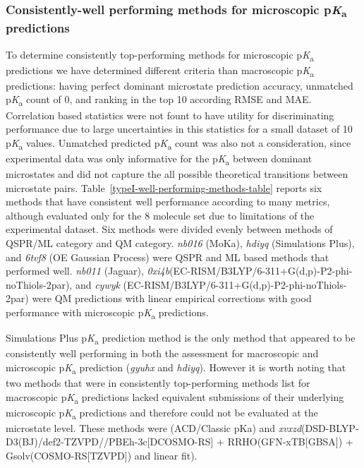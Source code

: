 \documentclass[9pt,lineno,final]{elife}
\newcommand{\pKa}{p\textit{K}\textsubscript{a}}
\begin{document}
\subsubsection{Consistently-well performing methods for microscopic \pKa{} predictions}

To determine consistently top-performing methods for microscopic \pKa{} predictions we have determined different criteria than macroscopic \pKa{} predictions: having perfect dominant microstate prediction accuracy, unmatched \pKa{} count of 0, and ranking in the top 10 according RMSE and MAE. Correlation based statistics were not fount to have utility for discriminating performance due to large uncertainties in this statistics for a small dataset of 10 \pKa{} values. Unmatched predicted \pKa{} count was also not a consideration, since experimental data was only informative for the \pKa{} between dominant microstates and did not capture the all possible theoretical transitions between microstate pairs. Table~\ref{typeI-well-performing-methods-table} reports six methods that have consistent well performance according to many metrics, although evaluated only for the 8 molecule set due to limitations of the experimental dataset. Six methods were divided evenly between methods of QSPR/ML category and QM category. \textit{nb016} (MoKa), \textit{hdiyq} (Simulations Plus), and \textit{6tvf8} (OE Gaussian Process) were QSPR and ML based methods that performed well. \textit{nb011} (Jaguar), \textit{0xi4b}(EC-RISM/B3LYP/6-311+G(d,p)-P2-phi-noThiols-2par), and \textit{cywyk} (EC-RISM/B3LYP/6-311+G(d,p)-P2-phi-noThiols-2par) were QM predictions with linear empirical corrections with good performance with microscopic \pKa{} predictions. 

Simulations Plus \pKa{} prediction method is the only method that appeared to be consistently well performing in both the assessment for macroscopic and microscopic \pKa{} prediction (\textit{gyuhx} and \textit{hdiyq}). However it is worth noting that two methods that were in consistently top-performing methods list for macroscopic \pKa{} predictions lacked equivalent submissions of their underlying microscopic \pKa{} predictions and therefore could not be evaluated at the microstate level. These methods were \textit{} (ACD/Classic pKa) and \textit{xvxzd}(DSD-BLYP-D3(BJ)/def2-TZVPD//PBEh-3c[DCOSMO-RS] + RRHO(GFN-xTB[GBSA]) + Gsolv(COSMO-RS[TZVPD]) and linear fit). 
\end{document}

